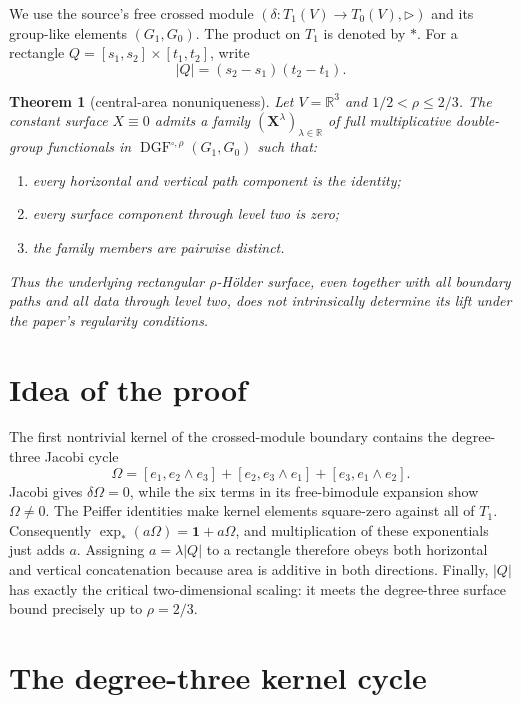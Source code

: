 \documentclass[11pt]{article}
\newtheorem{theorem}{Theorem}
\theoremstyle{remark}
\newcommand{\V}{V}
\newcommand{\one}{\mathbf 1}
\newcommand{\DGF}{\operatorname{DGF}}
\begin{document}
We use the source's free crossed module
$(\delta:T_1(\V)\to T_0(\V),\triangleright)$ and its group-like elements
$(G_1,G_0)$.  The product on $T_1$ is denoted by $*$.  For a rectangle
$Q=[s_1,s_2]\times[t_1,t_2]$, write
\[
 |Q|=(s_2-s_1)(t_2-t_1).
\]

\begin{theorem}[central-area nonuniqueness]\label{thm:main}
Let $\V=\mathbb R^3$ and $1/2<\rho\le2/3$.  The constant surface
$X\equiv0$ admits a family $(\mathbf X^\lambda)_{\lambda\in\mathbb R}$ of
full multiplicative double-group functionals in
$\DGF^{\square,\rho}(G_1,G_0)$ such that:
\begin{enumerate}[label=(\roman*)]
\item every horizontal and vertical path component is the identity;
\item every surface component through level two is zero;
\item the family members are pairwise distinct.
\end{enumerate}
Thus the underlying rectangular $\rho$-Hölder surface, even together with
all boundary paths and all data through level two, does not intrinsically
determine its lift under the paper's regularity conditions.
\end{theorem}

\section*{Idea of the proof}

The first nontrivial kernel of the crossed-module boundary contains the
degree-three Jacobi cycle
\[
 \Omega=[e_1,e_2\wedge e_3]+[e_2,e_3\wedge e_1]
       +[e_3,e_1\wedge e_2].
\]
Jacobi gives $\delta\Omega=0$, while the six terms in its free-bimodule
expansion show $\Omega\ne0$.  The Peiffer identities make kernel elements
square-zero against all of $T_1$.  Consequently
$\exp_*(a\Omega)=\one+a\Omega$, and multiplication of these exponentials
just adds $a$.  Assigning $a=\lambda|Q|$ to a rectangle therefore obeys
both horizontal and vertical concatenation because area is additive in both
directions.  Finally, $|Q|$ has exactly the critical two-dimensional scaling:
it meets the degree-three surface bound precisely up to $\rho=2/3$.

\section{The degree-three kernel cycle}
\end{document}

